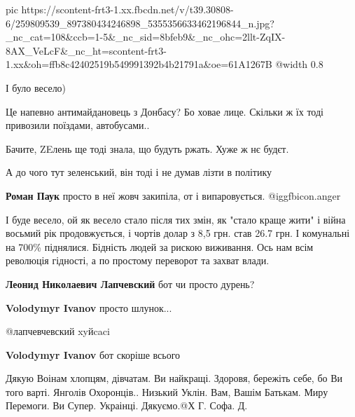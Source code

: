  
 
 
 
 

\ifcmt
  pic https://scontent-frt3-1.xx.fbcdn.net/v/t39.30808-6/259809539_897380434246898_5355356633462196844_n.jpg?_nc_cat=108&ccb=1-5&_nc_sid=8bfeb9&_nc_ohc=2llt-ZqIX-8AX_VeLcF&_nc_ht=scontent-frt3-1.xx&oh=ffb8c42402519b549991392b4b21791a&oe=61A1267B
  @width 0.8
\fi

\begin{multicols}{2}
І було весело)

Це напевно антимайдановець з Донбасу? Бо ховае лице. Скільки ж їх тоді привозили поїздами, автобусами..

Бачите, ZEлень ще тоді знала, що будуть ржать. Хуже ж нє будєт.

А до чого тут зеленський, він тоді і не думав лізти в політику

\textbf{Роман Паук} просто в неї жовч закипіла, от і випаровується. @igg{fbicon.anger} 


І буде весело, ой як весело стало після тих змін, як "стало краще жити" і війна
восьмий рік продовжується, і чортів долар з 8,5 грн. став 26.7 грн. І
комунальні на 700\% піднялися. Бідність людей за рискою виживання. Ось нам всім
революція гідності, а по простому переворот та захват влади.

\begin{itemize} %
\textbf{Леонид Николаевич Лапчевский} бот чи просто дурень?

\textbf{Volodymyr Ivanov} просто шлунок...

@лапчевчевский xyйcaci

\textbf{Volodymyr Ivanov} бот скоріше всього
\end{itemize} %


Дякую Воінам хлопцям, дівчатам. Ви найкращі. Здоровя, бережіть себе, бо Ви того
варті. Янголів Охоронців.. Низький Уклін. Вам, Вашім Батькам. Миру Перемоги. Ви
Супер. Украінці. Дякуємо.@Х Г. Софа. Д.


\end{multicols}
